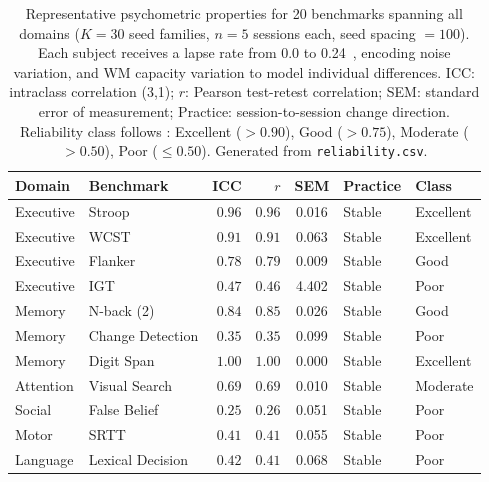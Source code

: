 \documentclass[11pt,letterpaper]{article}
\begin{document}
\begin{table}[t]
\centering
\caption{Representative psychometric properties for 20 benchmarks spanning all domains ($K = 30$ seed families, $n = 5$ sessions each, seed spacing $= 100$). Each subject receives a lapse rate from 0.0 to 0.24~\citep{wichmann2001psychometric}, encoding noise variation, and WM capacity variation to model individual differences. ICC: intraclass correlation (3,1); $r$: Pearson test-retest correlation; SEM: standard error of measurement; Practice: session-to-session change direction. Reliability class follows \citet{cicchetti1994guidelines}: Excellent ($> 0.90$), Good ($> 0.75$), Moderate ($> 0.50$), Poor ($\leq 0.50$). Generated from \texttt{reliability.csv}.}
\label{tab:psychometrics}
\small
\begin{tabular}{@{}llrrcll@{}}
\toprule
\textbf{Domain} & \textbf{Benchmark} & \textbf{ICC} & \textbf{$r$} & \textbf{SEM} & \textbf{Practice} & \textbf{Class} \\
\midrule
Executive     & Stroop             &  $\mathbf{0.96}$ &  $\mathbf{0.96}$ & 0.016 & Stable      & Excellent \\
Executive     & WCST               &  $\mathbf{0.91}$ &  $\mathbf{0.91}$ & 0.063 & Stable      & Excellent \\
Executive     & Flanker            &  $\mathbf{0.78}$ &  $\mathbf{0.79}$ & 0.009 & Stable      & Good \\
Executive     & IGT                &  $0.47$ &  $0.46$ & 4.402 & Stable      & Poor \\
Memory        & N-back (2)         &  $\mathbf{0.84}$ &  $\mathbf{0.85}$ & 0.026 & Stable      & Good \\
Memory        & Change Detection   &  $0.35$ &  $0.35$ & 0.099 & Stable      & Poor \\
Memory        & Digit Span         &  $\mathbf{1.00}$ &  $\mathbf{1.00}$ & 0.000 & Stable      & Excellent \\
Attention     & Visual Search      &  $0.69$ &  $0.69$ & 0.010 & Stable      & Moderate \\
Social        & False Belief       &  $0.25$ &  $0.26$ & 0.051 & Stable      & Poor \\
Motor         & SRTT               &  $0.41$ &  $0.41$ & 0.055 & Stable      & Poor \\
Language      & Lexical Decision   &  $0.42$ &  $0.41$ & 0.068 & Stable      & Poor \\

\end{tabular}
\end{table}
\end{document}

